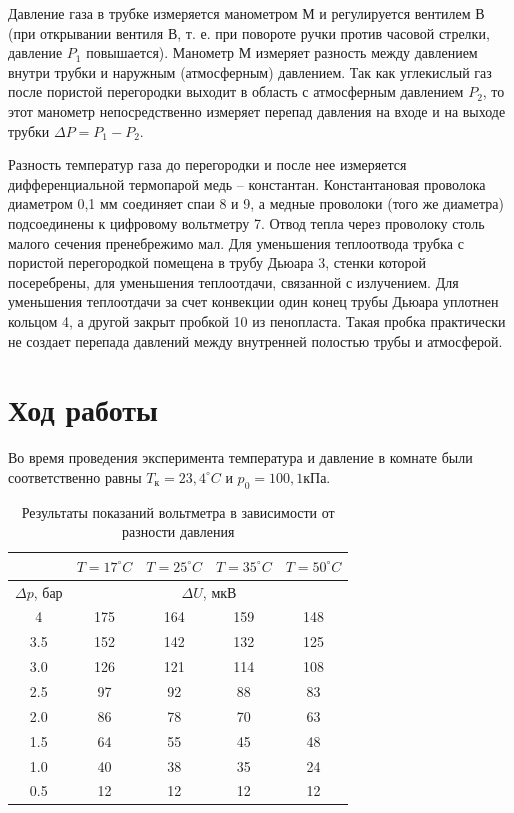 \documentclass[a4paper,12pt]{article} %
\begin{document}
Давление газа в трубке измеряется манометром М и регулируется вентилем В (при открывании вентиля В, т. е. при повороте ручки против часовой стрелки, давление $ P_1 $ повышается). Манометр М измеряет разность между давлением внутри трубки и наружным (атмосферным) давлением. Так как углекислый газ после пористой перегородки выходит в область с атмосферным давлением $ P_2 $, то этот манометр непосредственно измеряет перепад давления на входе и на выходе трубки $ \Delta P = P_1 - P_2 $.

Разность температур газа до перегородки и после нее измеряется дифференциальной термопарой медь -- константан. Константановая проволока диаметром 0,1 мм соединяет спаи 8 и 9, а медные проволоки (того же диаметра) подсоединены к цифровому вольтметру 7. Отвод тепла через проволоку столь малого сечения пренебрежимо мал. Для уменьшения теплоотвода трубка с пористой перегородкой помещена в трубу Дьюара 3, стенки которой посеребрены, для уменьшения теплоотдачи, связанной с излучением. Для уменьшения теплоотдачи за счет конвекции один конец трубы Дьюара уплотнен кольцом 4, а другой закрыт пробкой 10 из пенопласта. Такая пробка практически не создает перепада давлений между внутренней полостью трубы и атмосферой.

\section{Ход работы}
Во время проведения эксперимента температура и давление в комнате были соответственно равны $T_\text{к} = 23,4 ^\circ C$ и $p_0 = 100,1 $кПа.

\begin{table}[H]
    \begin{tabular}{|c|c|c|c|c|}
    \hline
    & $T = 17 ^\circ C$ & $T = 25 ^\circ C$ & $T = 35 ^\circ C$ & $T = 50 ^\circ C$ \\ \hline
    $\Delta p$, бар & \multicolumn{4}{|c|}{$\Delta U$, мкВ} \\ \hline
    4 & 175 & 164 & 159 & 148 \\ \hline
    3.5 & 152 & 142 & 132 & 125 \\ \hline
    3.0  & 126 & 121 & 114 & 108 \\ \hline
    2.5  & 97 & 92 & 88 & 83 \\ \hline
    2.0 & 86 & 78 & 70 & 63 \\ \hline
    1.5 & 64 & 55 & 45 & 48 \\ \hline
    1.0 & 40 & 38 & 35 & 24 \\ \hline
    0.5 & 12 & 12 & 12 & 12 \\ \hline
    \end{tabular}
    \caption {Результаты показаний вольтметра в зависимости от разности давления}
\end{table}
\end{document}
